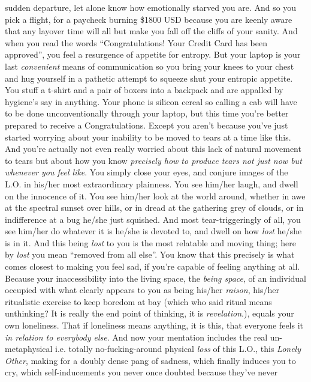 \documentclass{article}
\begin{document}
sudden departure, let alone know how emotionally starved you are. And so
you pick a flight, for a paycheck burning \$1800 USD because you are
keenly aware that any layover time will all but make you fall off the
cliffs of your sanity. And when you read the words ``Congratulations!
Your Credit Card has been approved'', you feel a resurgence of appetite
for entropy. But your laptop is your last \textit{convenient} means of
communication so you bring your knees to your chest and hug yourself in
a pathetic attempt to squeeze shut your entropic appetite. You stuff
a t-shirt and a pair of boxers into a backpack and are appalled by
hygiene's say in anything. Your phone is silicon cereal so calling
a cab will have to be done unconventionally through your laptop, but
this time you're better prepared to receive a Congratulations. Except
you aren't because you've just started worrying about your inability to
be moved to tears at a time like this. And you're actually not even
really worried about this lack of natural movement to tears but about
how you know \textit{precisely how to produce tears not just now but
whenever you feel like}. You simply close your eyes, and conjure images
of the L.O. in his/her most extraordinary plainness. You see him/her
laugh, and dwell on the innocence of it. You see him/her look at the
world around, whether in awe at the spectral sunset over hills, or in
dread at the gathering grey of clouds, or in indifference at a bug
he/she just squished. And most tear-triggeringly of all, you see him/her
do whatever it is he/she is devoted to, and dwell on how \textit{lost}
he/she is in it. And this being \textit{lost} to you is the most
relatable and moving thing; here by \textit{lost} you mean ``removed
from all else''. You know that this precisely is what comes closest to
making you feel sad, if you're capable of feeling anything at all.
Because your inaccessibility into the living space, the \textit{being
space}, of an individual occupied with what clearly appears to you as
being his/her \textit{raison}, his/her ritualistic exercise to keep
boredom at bay (which who said ritual means unthinking? It is really the
end point of thinking, it is \textit{revelation}.), equals your own
loneliness. That if loneliness means anything, it is this, that everyone
feels it \textit{in relation to everybody else}. And now your mentation
includes the real un-metaphysical i.e. totally no-fucking-around
physical \textit{loss} of this L.O., this \textit{Lonely Other}, making
for a doubly dense pang of sadness, which finally induces you to cry,
which self-inducements you never once doubted because they've never
\end{document}

